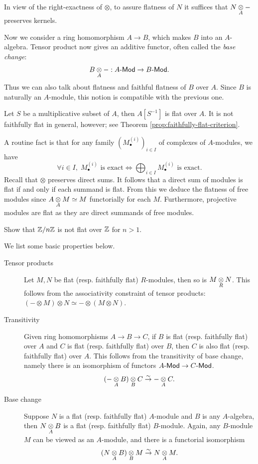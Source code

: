 \begin{remark}
	In view of the right-exactness of $\otimes$, to assure flatness of $N$ it suffices that $N \underset{A}{\otimes} -$ preserves kernels.
\end{remark}

Now we consider a ring homomorphism $A \to B$, which makes $B$ into an $A$-algebra. Tensor product now gives an additive functor, often called the \emph{base change}:
\[ B \underset{A}{\otimes} -: A\text{-}\mathsf{Mod} \to B\text{-}\mathsf{Mod}. \]
Thus we can also talk about flatness and faithful flatness of $B$ over $A$. Since $B$ is naturally an $A$-module, this notion is compatible with the previous one.
\begin{example}\label{eg:localization-flatness}
	Let $S$ be a multiplicative subset of $A$, then $A[S^{-1}]$ is flat over $A$. It is not faithfully flat in general, however; see Theorem \ref{prop:faithfully-flat-criterion}.
\end{example}

\begin{example}
	A routine fact is that for any family $\left( M^{(i)}_\bullet \right)_{i \in I}$ of complexes of $A$-modules, we have
	\[ \forall i \in I, \; M^{(i)}_\bullet \text{ is exact} \iff \bigoplus_{i \in I} M^{(i)}_\bullet \text{ is exact}. \]
	Recall that $\otimes$ preserves direct sums. It follows that a direct sum of modules is flat if and only if each summand is flat. From this we deduce the flatness of free modules since $A \underset{A}{\otimes} M \simeq M$ functorially for each $M$. Furthermore, projective modules are flat as they are direct summands of free modules.
\end{example}

\begin{exercise}
	Show that $\mathbb{Z}/n\mathbb{Z}$ is not flat over $\mathbb{Z}$ for $n > 1$.
\end{exercise}

We list some basic properties below.
\begin{description}
	\item[Tensor products] Let $M,N$ be flat (resp. faithfully flat) $R$-modules, then so is $M \underset{R}{\otimes} N$. This follows from the associativity constraint of tensor products: $(- \otimes M) \otimes N \simeq - \otimes (M \otimes N)$.
	\item[Transitivity] Given ring homomorphisms $A \to B \to C$, if $B$ is flat (resp. faithfully flat) over $A$ and $C$ is flat (resp. faithfully flat) over $B$, then $C$ is also flat (resp. faithfully flat) over $A$. This follows from the transitivity of base change, namely there is an isomorphism of functors $A\text{-}\mathsf{Mod} \to C\text{-}\mathsf{Mod}$.
	\[ (- \underset{A}{\otimes} B) \underset{B}{\otimes} C \stackrel{\sim}{\rightarrow} - \underset{A}{\otimes} C. \]
	\item[Base change] Suppose $N$ is a flat (resp. faithfully flat) $A$-module and $B$ is any $A$-algebra, then $N \underset{A}{\otimes} B$ is a flat (resp. faithfully flat) $B$-module. Again, any $B$-module $M$ can be viewed as an $A$-module, and there is a functorial isomorphism
	\[ (N \underset{A}{\otimes} B) \underset{B}{\otimes} M \stackrel{\sim}{\rightarrow} N \underset{A}{\otimes} M. \]
\end{description}

